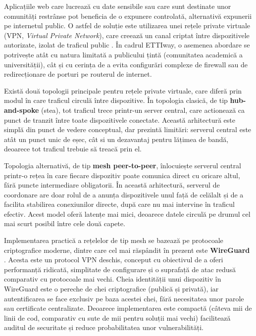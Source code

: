 Aplicațiile web care lucrează cu date sensibile sau care sunt destinate unor
comunități restrânse pot beneficia de o expunere controlată, alternativă
expunerii pe internetul public. O astfel de soluție este utilizarea unei rețele
private virtuale (VPN, \textit{Virtual Private Network}), care creează un canal
criptat între dispozitivele autorizate, izolat de traficul public \cite{NIST_VPN}. În cadrul
ETTIway, o asemenea abordare se potrivește atât cu natura limitată a publicului
țintă (comunitatea academică a universității), cât și cu cerința de a evita
configurări complexe de firewall sau de redirecționare de porturi pe routerul
de internet.
 
Există două topologii principale pentru rețele private virtuale, care diferă
prin modul în care traficul circulă între dispozitive. În topologia clasică, de
tip \textbf{hub-and-spoke} (stea), tot traficul trece printr-un server central,
care actionează ca punct de tranzit între toate dispozitivele conectate. Această
arhitectură este simplă din punct de vedere conceptual, dar prezintă
limitări: serverul central este atât un punct unic de eșec, cât si un dezavantaj pentru lățimea de bandă, deoarece tot traficul trebuie să treacă prin el.
 
Topologia alternativă, de tip \textbf{mesh peer-to-peer}, înlocuiește serverul
central printr-o rețea în care fiecare dispozitiv poate comunica direct cu
oricare altul, fără puncte intermediare obligatorii. În această arhitectură,
serverul de coordonare are doar rolul de a anunța dispozitivele unul față de
celălalt și de a facilita stabilirea conexiunilor directe, după care nu mai
intervine în traficul efectiv. Acest model 
oferă latențe mai mici, deoarece datele circulă pe drumul cel mai scurt posibil
între cele două capete.\cite{Tailscale}
 
Implementarea practică a rețelelor de tip mesh se bazează pe protocoale
criptografice moderne, dintre care cel mai răspândit în prezent este
\textbf{WireGuard} \cite{Donenfeld2017}. Acesta este un protocol VPN deschis, conceput cu obiectivul
de a oferi performanță ridicată, simplitate de configurare și o suprafață de
atac redusă comparativ cu protocoale mai vechi. Cheia identității unui
dispozitiv în WireGuard este o pereche de chei criptografice (publică și
privată), iar autentificarea se face exclusiv pe baza acestei chei, fără
necesitatea unor parole sau certificate centralizate. Deoarece 
implementarea este compactă (câteva mii de linii de cod, comparativ cu sute de mii pentru
soluții mai vechi) facilitează auditul de securitate și reduce probabilitatea
unor vulnerabilități.
 
